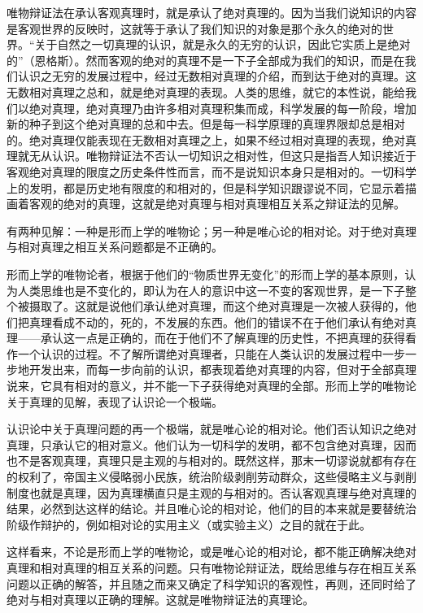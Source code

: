 唯物辩证法在承认客观真理时，就是承认了绝对真理的。因为当我们说知识的内容是客观世界的反映时，这就等于承认了我们知识的对象是那个永久的绝对的世界。“关于自然之一切真理的认识，就是永久的无穷的认识，因此它实质上是绝对的”（恩格斯）。然而客观的绝对的真理不是一下子全部成为我们的知识，而是在我们认识之无穷的发展过程中，经过无数相对真理的介绍，而到达于绝对的真理。这无数相对真理之总和，就是绝对真理的表现。人类的思维，就它的本性说，能给我们以绝对真理，绝对真理乃由许多相对真理积集而成，科学发展的每一阶段，增加新的种子到这个绝对真理的总和中去。但是每一科学原理的真理界限却总是相对的。绝对真理仅能表现在无数相对真理之上，如果不经过相对真理的表现，绝对真理就无从认识。唯物辩证法不否认一切知识之相对性，但这只是指吾人知识接近于客观绝对真理的限度之历史条件性而言，而不是说知识本身只是相对的。一切科学上的发明，都是历史地有限度的和相对的，但是科学知识跟谬说不同，它显示着描画着客观的绝对的真理，这就是绝对真理与相对真理相互关系之辩证法的见解。

有两种见解：一种是形而上学的唯物论；另一种是唯心论的相对论。对于绝对真理与相对真理之相互关系问题都是不正确的。

形而上学的唯物论者，根据于他们的“物质世界无变化”的形而上学的基本原则，认为人类思维也是不变化的，即认为在人的意识中这一不变的客观世界，是一下子整个被摄取了。这就是说他们承认绝对真理，而这个绝对真理是一次被人获得的，他们把真理看成不动的，死的，不发展的东西。他们的错误不在于他们承认有绝对真理——承认这一点是正确的，而在于他们不了解真理的历史性，不把真理的获得看作一个认识的过程。不了解所谓绝对真理者，只能在人类认识的发展过程中一步一步地开发出来，而每一步向前的认识，都表现着绝对真理的内容，但对于全部真理说来，它具有相对的意义，并不能一下子获得绝对真理的全部。形而上学的唯物论关于真理的见解，表现了认识论一个极端。

认识论中关于真理问题的再一个极端，就是唯心论的相对论。他们否认知识之绝对真理，只承认它的相对意义。他们认为一切科学的发明，都不包含绝对真理，因而也不是客观真理，真理只是主观的与相对的。既然这样，那末一切谬说就都有存在的权利了，帝国主义侵略弱小民族，统治阶级剥削劳动群众，这些侵略主义与剥削制度也就是真理，因为真理横直只是主观的与相对的。否认客观真理与绝对真理的结果，必然到达这样的结论。并且唯心论的相对论，他们的目的本来就是要替统治阶级作辩护的，例如相对论的实用主义（或实验主义）之目的就在于此。

这样看来，不论是形而上学的唯物论，或是唯心论的相对论，都不能正确解决绝对真理和相对真理的相互关系的问题。只有唯物论辩证法，既给思维与存在相互关系问题以正确的解答，并且随之而来又确定了科学知识的客观性，再则，还同时给了绝对与相对真理以正确的理解。这就是唯物辩证法的真理论。

